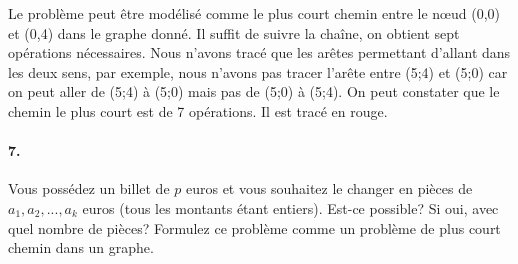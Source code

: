 \begin{solution}
\begin{solution}
Le problème peut être modélisé comme le plus court chemin entre le nœud (0,0) et (0,4) dans le graphe donné. Il suffit de suivre la chaîne, on obtient sept opérations nécessaires. Nous n'avons tracé que les arêtes permettant d'allant dans les deux sens, par exemple, nous n'avons pas tracer  l'arête entre (5;4) et (5;0) car on peut aller de (5;4) à (5;0) mais pas de (5;0) à (5;4). On peut constater que le chemin le plus court est de 7 opérations. Il est tracé en rouge.
\begin{figure}[h!]
\centering
{}
\end{figure}
\end{solution}

\paragraph{7. }
	Vous possédez un billet de $p$ euros et vous souhaitez le changer en pièces de $a_1, a_2, ..., a_k$ euros (tous les montants étant entiers). Est-ce possible? Si oui, avec quel nombre de pièces? Formulez ce problème comme un problème de plus court chemin dans un graphe.



\end{solution}
